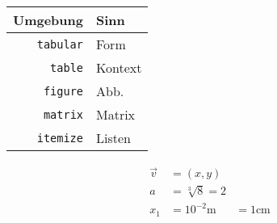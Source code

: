 
\begin{tabular}{r|l}
	Umgebung & Sinn \\
	\hline
	{\tt tabular} & Form \\
	{\tt table} & Kontext \\
	{\tt figure} & Abb. \\
	{\tt matrix} & Matrix \\
	{\tt itemize} & Listen \\
\end{tabular}

\begin{align*}
	\vec{v} &= (x, y) \\
	a   &= \sqrt[3]{8} = 2 \\
	x_1 &= 10^{-2}\text{m} &= 1\text{cm} \\
\end{align*}
